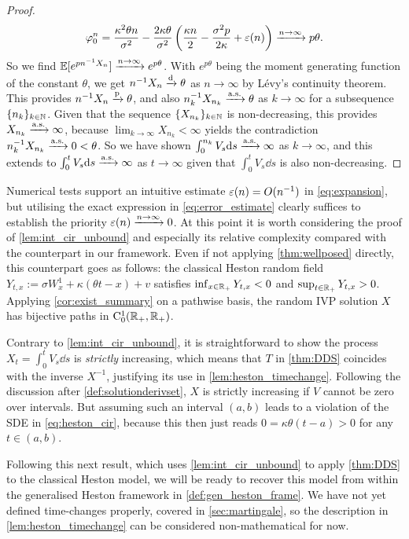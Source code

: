 \begin{proof}
    \begin{equation}
        \varphi_0^n = \frac{\kappa^2\theta n}{\sigma^2}- \frac{2\kappa\theta}{\sigma^2}\left(\frac{\kappa n}{2} - \frac{\sigma^2 p}{2\kappa}+ \varepsilon(n)\right) \xrightarrow{n\to\infty} p\theta.
    \end{equation}
    So we find $\mathbb{E}[e^{pn^{-1}X_n}]\xrightarrow{n\to\infty}e^{p\theta}$. With $e^{p\theta}$ being the moment generating function of the constant $\theta$, we get $n^{-1}{X_n}\xrightarrow{\mathrm{d}} \theta$ as $n\to\infty$ by L\'evy's continuity theorem. This provides $n^{-1}{X_n}\xrightarrow{\mathrm{p}} \theta$, and also $n_k^{-1}{X_{n_k}}\xrightarrow{\mathrm{a.s.}} \theta$ as $k\to\infty$ for a subsequence $\{n_k\}_{k\in\mathbb{N}}$. Given that the sequence $\{X_{n_k}\}_{k\in\mathbb{N}}$ is non-decreasing, this provides $X_{n_k}\xrightarrow{\mathrm{a.s.}} \infty$, because $\lim_{k\to\infty}X_{n_k}< \infty$ yields the contradiction $n_k^{-1}{X_{n_k}}\xrightarrow{\mathrm{a.s.}} 0<\theta$. So we have shown $\int_0^{n_k} V_s\mathrm{d} s\xrightarrow{\mathrm{a.s.}} \infty$ as $k\to\infty$, and this extends to $\int_0^t V_s\mathrm{d} s\xrightarrow{\mathrm{a.s.}} \infty$ as $t\to\infty$ given that $\int_0^tV_s\dd s$ is also non-decreasing.
\end{proof}

Numerical tests support an intuitive estimate $\varepsilon(n)=O(n^{-1})$ in \autoref{eq:expansion}, but utilising the exact expression in \autoref{eq:error_estimate} clearly suffices to establish the priority $\varepsilon(n)\xrightarrow{n\to\infty}0$. At this point it is worth considering the proof of \autoref{lem:int_cir_unbound} and especially its relative complexity compared with the counterpart in our framework. Even if not applying \autoref{thm:wellposed} directly, this counterpart goes as follows: the classical Heston random field $Y_{t,x}:=\sigma W^1_x+\kappa(\theta t - x)+v$ satisfies $\inf_{x\in\mathbb{R}_+}Y_{t,x}<0$ and $\sup_{t\in\mathbb{R}_+}Y_{t,x}>0$. Applying \autoref{cor:exist_summary} on a pathwise basis, the random IVP solution $X$ has bijective paths in $\mathrm{C}_0^1(\mathbb{R}_+,\mathbb{R}_+)$.

Contrary to \autoref{lem:int_cir_unbound}, it is straightforward to show the process $X_t=\int_0^t V_s\dd s$ is \emph{strictly} increasing, which means that $T$ in \autoref{thm:DDS} coincides with the inverse $X^{-1}$, justifying its use in \autoref{lem:heston_timechange}. Following the discussion after \autoref{def:solutionderivset}, $X$ is strictly increasing if $V$ cannot be zero over intervals. But assuming such an interval $(a,b)$ leads to a violation of the SDE in \autoref{eq:heston_cir}, because this then just reads $0=\kappa\theta(t-a)>0$ for any $t\in(a,b)$.

Following this next result, which uses \autoref{lem:int_cir_unbound} to apply \autoref{thm:DDS} to the classical Heston model, we will be ready to recover this model from within the generalised Heston framework in \autoref{def:gen_heston_frame}. We have not yet defined time-changes properly, covered in \autoref{sec:martingale}, so the description in \autoref{lem:heston_timechange} can be considered non-mathematical for now.


